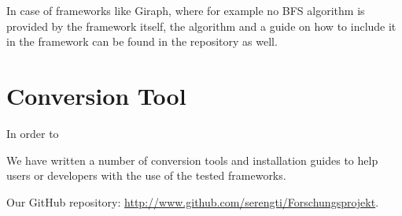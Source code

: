 \documentclass[a4paper]{IEEEtran}
\begin{document}
In case of frameworks like Giraph, where for example no BFS algorithm is provided by the framework itself, the algorithm and a guide on how to include it in the framework can be found in the repository as well. 

\section{Conversion Tool}\label{app:conversionTool}
In order to

We have written a number of conversion tools and installation guides to help
users or developers with the use of the tested frameworks.


Our GitHub repository: \url{http://www.github.com/serengti/Forschungsprojekt}.








% 
% 


\end{document}
